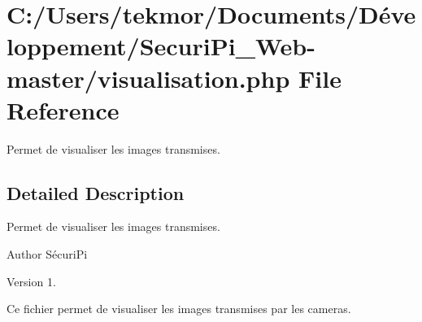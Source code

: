 \section{C\+:/\+Users/tekmor/\+Documents/\+Développement/\+Securi\+Pi\+\_\+\+Web-\/master/visualisation.php File Reference}
\label{visualisation_8php}


Permet de visualiser les images transmises.  




\subsection{Detailed Description}
Permet de visualiser les images transmises. 

\begin{DoxyAuthor}{Author}
Sécuri\+Pi 
\end{DoxyAuthor}
\begin{DoxyVersion}{Version}
1.
\end{DoxyVersion}
Ce fichier permet de visualiser les images transmises par les cameras. 